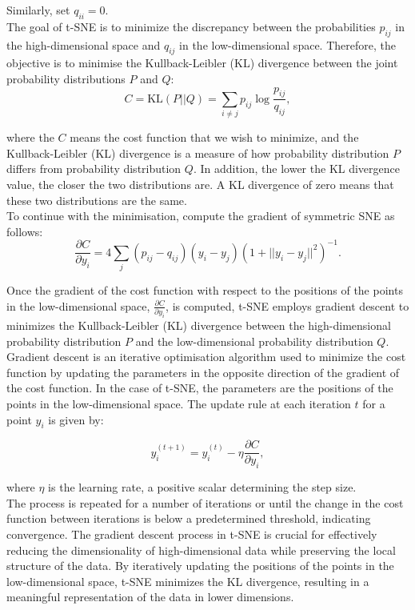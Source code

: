 \documentclass{article}\usepackage[]{graphicx}\usepackage[]{xcolor}
\numberwithin{equation}{section}
\begin{document}
\noindent
Similarly, set $q_{ii}=0$.\\

\noindent
The goal of t-SNE is to minimize the discrepancy between the probabilities 
$p_ {ij}$ in the high-dimensional space and $q_{ij}$ in the low-dimensional space. Therefore, the objective is to minimise the Kullback-Leibler (KL) divergence \cite{vanderMaaten2008tsne} between the joint probability distributions $P$ and $Q$:
    \[
        C = \text{KL}(P || Q) = \sum_{i \neq j} p_{ij} \log \frac{p_{ij}}{q_{ij}},
    \]
    
\noindent
where the $C$ means the cost function that we wish to minimize, and the Kullback-Leibler (KL) divergence is a measure of how probability distribution $P$ differs from probability distribution $Q$. In addition, the lower the KL divergence value, the closer the two distributions are. A KL divergence of zero means that these two distributions are the same.\\

\noindent
To continue with the minimisation, compute the gradient of symmetric SNE \cite{vanderMaaten2008tsne} as follows:
\[\frac{\partial C}{\partial y_i} = 4 \sum_j (p_{ij} - q_{ij})(y_i - y_j)(1 + ||y_i - y_j||^2)^{-1}
.\]

\noindent
Once the gradient of the cost function with respect to the positions of the points in the low-dimensional space, $\frac{\partial C}{\partial y_i}$, is computed, t-SNE employs gradient descent to minimizes the Kullback-Leibler (KL) divergence between the high-dimensional probability distribution $P$ and the low-dimensional probability distribution $Q$. Gradient descent is an iterative optimisation algorithm used to minimize the cost function by updating the parameters in the opposite direction of the gradient of the cost function. In the case of t-SNE, the parameters are the positions of the points in the low-dimensional space. The update rule \cite{vanderMaaten2008tsne} at each iteration $t$ for a point $y_i$ is given by:

\[y_i^{(t+1)} = y_i^{(t)} - \eta \frac{\partial C}{\partial y_i},\]

\noindent
where $\eta$ is the learning rate, a positive scalar determining the step size.\\

\noindent
The process is repeated for a number of iterations or until the change in the cost function between iterations is below a predetermined threshold, indicating convergence. The gradient descent process in t-SNE is crucial for effectively reducing the dimensionality of high-dimensional data while preserving the local structure of the data. By iteratively updating the positions of the points in the low-dimensional space, t-SNE minimizes the KL divergence, resulting in a meaningful representation of the data in lower dimensions.
\end{document}
